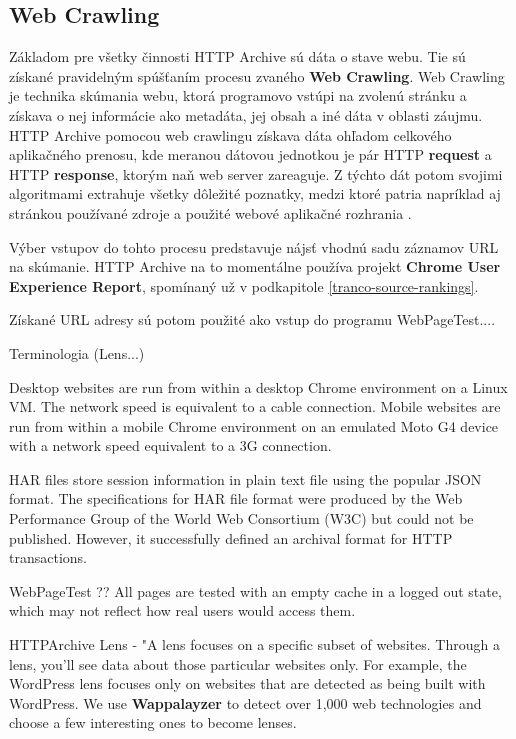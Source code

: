 {\subsection{Web Crawling}

Základom pre všetky činnosti HTTP Archive sú dáta o stave webu. Tie sú získané pravidelným spúšťaním procesu zvaného \textbf{Web Crawling}.
Web Crawling je technika skúmania webu, ktorá programovo vstúpi na zvolenú stránku a získava o nej informácie ako metadáta, jej obsah a iné dáta v oblasti záujmu.\cite{httparchive-webcrawling}
HTTP Archive pomocou web crawlingu získava dáta ohľadom celkového aplikačného prenosu, kde meranou dátovou jednotkou je pár HTTP \textbf{request} a HTTP \textbf{response}, ktorým naň web server zareaguje. 
Z týchto dát potom svojimi algoritmami extrahuje všetky dôležité poznatky, medzi ktoré patria napríklad aj stránkou používané zdroje a použité webové aplikačné rozhrania \cite{httparchive-homepage}.

Výber vstupov do tohto procesu predstavuje nájsť vhodnú sadu záznamov URL na skúmanie. 
HTTP Archive na to momentálne používa projekt \textbf{Chrome User Experience Report}, spomínaný už v podkapitole \ref{tranco-source-rankings}.

Získané URL adresy sú potom použité ako vstup do programu WebPageTest....


Terminologia (Lens...)

Desktop websites are run from within a desktop Chrome environment on a Linux VM. The network speed is equivalent to a cable connection.
Mobile websites are run from within a mobile Chrome environment on an emulated Moto G4 device with a network speed equivalent to a 3G connection.

HAR files store session information in plain text file using the popular JSON format. The specifications for HAR file format were produced by the Web Performance Group of the World Web Consortium (W3C) but could not be published. However, it successfully defined an archival format for HTTP transactions.

WebPageTest ??
All pages are tested with an empty cache in a logged out state, which may not reflect how real users would access them.

HTTPArchive Lens - "A lens focuses on a specific subset of websites. Through a lens, you'll see data about those particular websites only. For example, the WordPress lens focuses only on websites that are detected as being built with WordPress. We use \textbf{Wappalayzer} to detect over 1,000 web technologies and choose a few interesting ones to become lenses.


}
